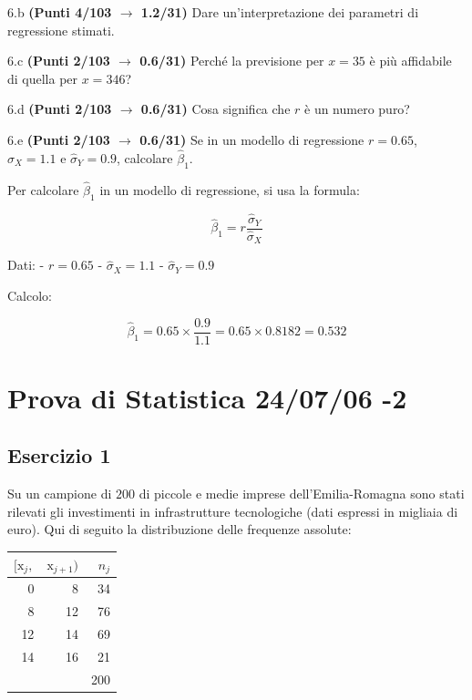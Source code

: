 \documentclass[
  11pt,
]{book}
\theoremstyle{mytheoremstyle}
\theoremstyle{mydefstyle}
\newenvironment{sol}
  {
  \begin{tcolorbox}[enhanced,breakable,arc=0.1mm,boxrule=1pt,colback=white,colframe=iblue,
  title=\bf \fontfamily{lmss}\selectfont \hspace{.5 cm} Soluzione,drop fuzzy shadow]

}{
\end{tcolorbox}
  }
\begin{document}
6.b \textbf{(Punti 4/103 \(\rightarrow\) 1.2/31)} Dare un'interpretazione dei parametri di regressione stimati.

6.c \textbf{(Punti 2/103 \(\rightarrow\) 0.6/31)} Perché la previsione per \(x=35\) è più affidabile di quella per \(x=346\)?

6.d \textbf{(Punti 2/103 \(\rightarrow\) 0.6/31)} Cosa significa che \(r\) è un numero puro?

6.e \textbf{(Punti 2/103 \(\rightarrow\) 0.6/31)} Se in un modello di regressione \(r=0.65\), \(\hat\sigma_X=1.1\) e \(\hat\sigma_Y=0.9\), calcolare \(\hat\beta_1\).

\begin{sol}
Per calcolare \(\hat\beta_1\) in un modello di regressione, si usa la formula:

\[
\hat\beta_1 = r \frac{\hat\sigma_Y}{\hat\sigma_X}
\]

Dati:
- \(r = 0.65\)
- \(\hat\sigma_X = 1.1\)
- \(\hat\sigma_Y = 0.9\)

Calcolo:

\[
\hat\beta_1 = 0.65 \times \frac{0.9}{1.1} = 0.65 \times 0.8182 = 0.532
\]

\end{sol}

\section{Prova di Statistica 24/07/06 -2}\label{prova-di-statistica-240706--2}

\subsection{Esercizio 1}\label{esercizio-1-41}

Su un campione di \(200\) di piccole e medie imprese dell'Emilia-Romagna sono stati rilevati gli investimenti in infrastrutture tecnologiche (dati espressi in migliaia di euro). Qui di seguito la distribuzione delle frequenze assolute:

\begin{table}[H]
\centering
\begin{tabular}{rrr}
\toprule
$[\text{x}_j,$ & $\text{x}_{j+1})$ & $n_j$\\
\midrule
0 & 8 & 34\\
8 & 12 & 76\\
12 & 14 & 69\\
14 & 16 & 21\\
 &  & 200\\
\bottomrule
\end{tabular}
\end{table}
\end{document}
